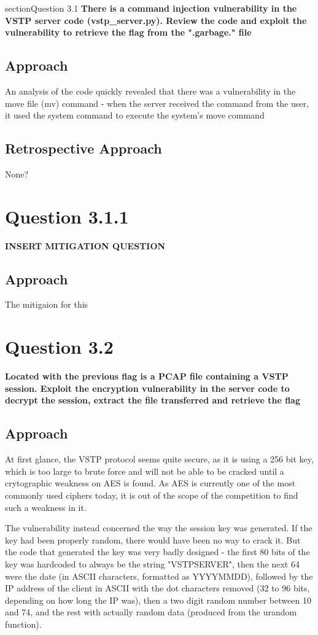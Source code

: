 section{Question 3.1}
\textbf{There is a command injection vulnerability in the VSTP server code
(vstp\_server.py). Review the code and exploit the vulnerability to retrieve the
flag from the ".garbage." file}
\subsection{Approach}
An analysis of the code quickly revealed that there was a vulnerability in the
move file (mv) command - when the server received the command from the user,
it used the system command to execute the system's move command 

\subsection{Retrospective Approach}
None?

\section{Question 3.1.1}
\textbf{INSERT MITIGATION QUESTION}
\subsection{Approach}
The mitigaion for this 

\section{Question 3.2}
\textbf{Located with the previous flag is a PCAP file containing a VSTP session.
Exploit the encryption vulnerability in the server code to decrypt the session,
extract the file transferred and retrieve the flag}
\subsection{Approach}
At first glance, the VSTP protocol seems quite secure, as it is using a 256
bit key, which is too large to brute force and will not be able to be cracked
until a crytographic weakness on AES is found. As AES is currently one of the
most commonly used ciphers today, it is out of the scope of the competition to
find such a weakness in it.

The vulnerability instead concerned the way the session key was generated. If
the key had been properly random, there would have been no way to crack it. But
the code that generated the key was very badly designed - the first 80 bits of
the key was hardcoded to always be the string "VSTPSERVER", then the next 64
were the date (in ASCII characters, formatted as YYYYMMDD), followed by the IP
address of the client in ASCII with the dot characters removed (32 to 96 bits,
depending on how long the IP was), then a two digit random number between 10
and 74, and the rest with actually random data (produced from the urandom 
function).

